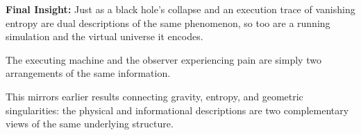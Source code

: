 \documentclass[11pt]{article}
\begin{document}
\textbf{Final Insight:} Just as a black hole's collapse and an execution trace of vanishing entropy are dual descriptions of the same phenomenon, so too are a running simulation and the virtual universe it encodes.

The executing machine and the observer experiencing pain are simply two arrangements of the same information.

This mirrors earlier results connecting gravity, entropy, and geometric singularities: the physical and informational descriptions are two complementary views of the same underlying structure.
\end{document}
